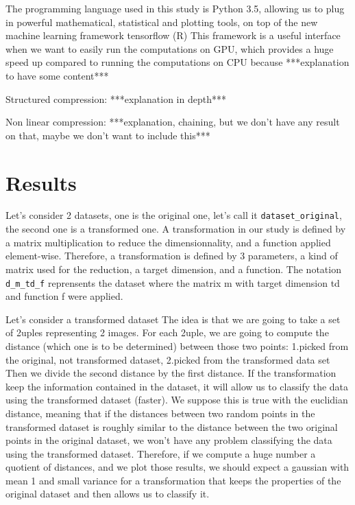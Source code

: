 \documentclass[11pt,a4paper]{article}
\begin{document}
	The programming language used in this study is Python 3.5, allowing us to plug in powerful mathematical, statistical and plotting tools, on top of the new machine learning framework tensorflow (R)
	This framework is a useful interface when we want to easily run the computations on GPU, which provides a huge speed up compared to running the computations on CPU because ***explanation to have some content***
	
	Structured compression:
	***explanation in depth***
	
	Non linear compression:
	***explanation, chaining, but we don't have any result on that, maybe we don't want to include this***
	
	\section{Results}
	Let's consider 2 datasets, one is the original one, let's call it \texttt{dataset\_original}, the second one is a transformed one.
	A transformation in our study is defined by a matrix multiplication to reduce the dimensionnality, and a function applied element-wise. Therefore, a transformation is defined by 3 parameters, a kind of matrix used for the reduction, a target dimension, and a function.
	The notation \texttt{d\_m\_td\_f} reprensents the dataset where the matrix m with target dimension td and function f were applied.
	
	Let's consider a transformed dataset
	The idea is that we are going to take a set of 2uples representing 2 images. For each 2uple, we are going to compute the distance (which one is to be determined) between those two points:
	1.picked from the original, not transformed dataset,
	2.picked from the transformed data set
	Then we divide the second distance by the first distance. If the transformation keep the information contained in the dataset, it will allow us to classify the data using the transformed dataset (faster). We suppose this is true with the euclidian distance, meaning that if the distances between two random points in the transformed dataset is roughly similar to the distance between the two original points in the original dataset, we won't have any problem classifying the data using the transformed dataset.
	Therefore, if we compute a huge number a quotient of distances, and we plot those results, we should expect a gaussian with mean 1 and small variance for a transformation that keeps the properties of the original dataset and then allows us to classify it.
	
\end{document}
